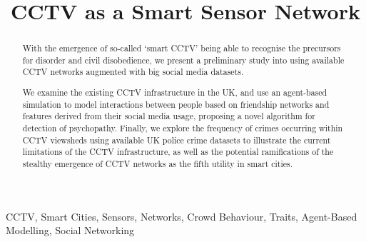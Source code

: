 \documentclass[conference]{IEEEtran}
\begin{document}
%
\title{CCTV as a Smart Sensor Network}


\author{
}





\maketitle


\begin{abstract}
With the emergence of so-called `smart CCTV' being able to recognise
the precursors for disorder and civil disobedience, we present a
preliminary study into using available CCTV networks augmented with
big social media datasets.

We examine the existing CCTV infrastructure in the UK, and use an
agent-based simulation to model interactions between people based on
friendship networks and features derived from their social media
usage, proposing a novel algorithm for detection of
psychopathy. Finally, we explore the frequency of crimes occurring
within CCTV viewsheds using available UK police crime datasets to
illustrate the current limitations of the CCTV infrastructure, as well
as the potential ramifications of the stealthy emergence of CCTV
networks as the fifth utility in smart cities.
\end{abstract}

%

\begin{IEEEkeywords}
CCTV, Smart Cities, Sensors, Networks, Crowd Behaviour, Traits, Agent-Based
Modelling, Social Networking
\end{IEEEkeywords}
\end{document}
